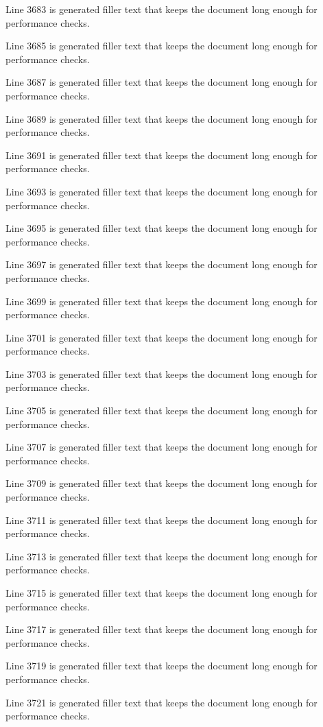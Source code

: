 Line 3683 is generated filler text that keeps the document long enough for performance checks.

Line 3685 is generated filler text that keeps the document long enough for performance checks.

Line 3687 is generated filler text that keeps the document long enough for performance checks.

Line 3689 is generated filler text that keeps the document long enough for performance checks.

Line 3691 is generated filler text that keeps the document long enough for performance checks.

Line 3693 is generated filler text that keeps the document long enough for performance checks.

Line 3695 is generated filler text that keeps the document long enough for performance checks.

Line 3697 is generated filler text that keeps the document long enough for performance checks.

Line 3699 is generated filler text that keeps the document long enough for performance checks.

Line 3701 is generated filler text that keeps the document long enough for performance checks.

Line 3703 is generated filler text that keeps the document long enough for performance checks.

Line 3705 is generated filler text that keeps the document long enough for performance checks.

Line 3707 is generated filler text that keeps the document long enough for performance checks.

Line 3709 is generated filler text that keeps the document long enough for performance checks.

Line 3711 is generated filler text that keeps the document long enough for performance checks.

Line 3713 is generated filler text that keeps the document long enough for performance checks.

Line 3715 is generated filler text that keeps the document long enough for performance checks.

Line 3717 is generated filler text that keeps the document long enough for performance checks.

Line 3719 is generated filler text that keeps the document long enough for performance checks.

Line 3721 is generated filler text that keeps the document long enough for performance checks.

